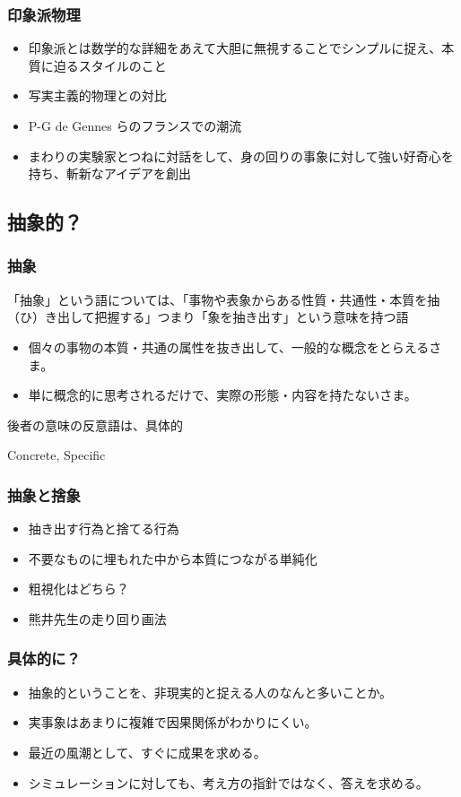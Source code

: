\documentclass[12pt, dvipdfmx]{beamer}
\begin{document}
\begin{frame}
    \frametitle{印象派物理}

    \begin{itemize}
        \item 印象派とは数学的な詳細をあえて大胆に無視することでシンプルに捉え、本質に迫るスタイルのこと
        \item 写実主義的物理との対比
        \item P-G de Gennes らのフランスでの潮流
        \item まわりの実験家とつねに対話をして、身の回りの事象に対して強い好奇心を持ち、斬新なアイデアを創出
    \end{itemize}

\end{frame}
\subsection{抽象的？}
\begin{frame}
    \frametitle{抽象}

    「抽象」という語については、「事物や表象からある性質・共通性・本質を抽（ひ）き出して把握する」つまり「象を抽き出す」という意味を持つ語


    \begin{itemize}
        \item 個々の事物の本質・共通の属性を抜き出して、一般的な概念をとらえるさま。
        \item 単に概念的に思考されるだけで、実際の形態・内容を持たないさま。
    \end{itemize}

    後者の意味の反意語は、具体的

    Concrete, Specific

\end{frame}

\begin{frame}
    \frametitle{抽象と捨象}
    \begin{itemize}
        \item 抽き出す行為と捨てる行為
        \item 不要なものに埋もれた中から本質につながる単純化
        \item 粗視化はどちら？
        \item 熊井先生の走り回り画法
    \end{itemize}
\end{frame}



\begin{frame}
    \frametitle{具体的に？}
    \begin{itemize}
        \item 抽象的ということを、非現実的と捉える人のなんと多いことか。
        \item 実事象はあまりに複雑で因果関係がわかりにくい。
        \item 最近の風潮として、すぐに成果を求める。
        \item シミュレーションに対しても、考え方の指針ではなく、答えを求める。
    \end{itemize}
\end{frame}
\end{document}
